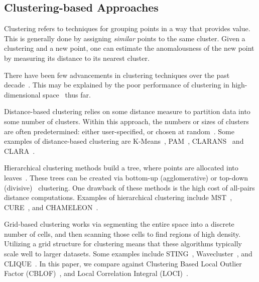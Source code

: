 \subsection{Clustering-based Approaches}
\label{subsec:introduction:clustering-based-approaches}

Clustering refers to techniques for grouping points in a way that provides value.
This is generally done by assigning \textit{similar} points to the same cluster.
Given a clustering and a new point, one can estimate the anomalousness of the new point by measuring its distance to its nearest cluster.

There have been few advancements in clustering techniques over the past decade~\cite{wang2019progress}.
This may be explained by the poor performance of clustering in high-dimensional space~\cite{zhang2013advancements} thus far.

Distance-based clustering relies on some distance measure to partition data into some number of clusters.
Within this approach, the numbers or sizes of clusters are often predetermined: either user-specified, or chosen at random~\cite{wang2019progress}.
Some examples of distance-based clustering are
K-Means~\cite{macqueen1967some},
PAM~\cite{kaufman2009finding},
CLARANS~\cite{ng1994efficient} and
CLARA~\cite{kaufman2009finding}.

Hierarchical clustering methods build a tree, where points are allocated into leaves~\cite{wang2019progress}.
These trees can be created via bottom-up (agglomerative) or top-down (divisive)~\cite{agrawal1998automatic} clustering.
One drawback of these methods is the high cost of all-pairs distance computations.
Examples of hierarchical clustering include
MST~\cite{zahn1971graph},
CURE~\cite{guha1998cure}, and
CHAMELEON~\cite{karypis1999hierarchical}.

Grid-based clustering works via segmenting the entire space into a discrete number of cells, and then scanning those cells to find regions of high density.
Utilizing a grid structure for clustering means that these algorithms typically scale well to larger datasets.
Some examples include
STING~\cite{wang1997sting},
Wavecluster~\cite{sheikholeslami2000wavecluster}, and
CLIQUE~\cite{agrawal1998automatic}. In this paper, we compare against Clustering Based Local Outlier Factor (CBLOF)~\cite{he2003cblof}, and
Local Correlation Integral (LOCI)~\cite{papadimitriou2003loci}.



